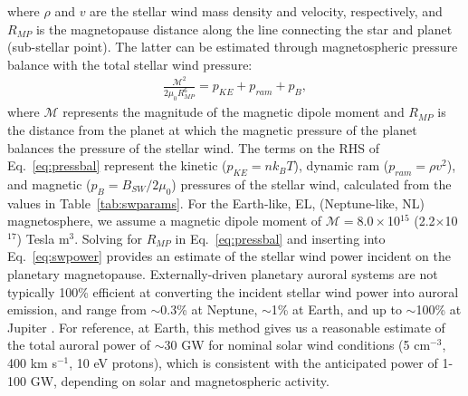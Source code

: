 \documentclass[apjl]{emulateapj}
\begin{document}
\noindent where $\rho$ and $v$ are the stellar wind mass density and velocity, respectively, and $R_{MP}$ is the magnetopause distance along the line connecting the star and planet (sub-stellar point). The latter can be estimated through magnetospheric pressure balance with the total stellar wind pressure:
\begin{align}
    \frac{\mathcal{M}^2}{2 \mu_0 R_{MP}^6} = p_{KE} + p_{ram} + p_{B}, \label{eq:pressbal}
\end{align}
where $\mathcal{M}$ represents the magnitude of the magnetic dipole moment and $R_{MP}$ is the distance from the planet at which the magnetic pressure of the planet balances the pressure of the stellar wind. The terms on the RHS of Eq.~\ref{eq:pressbal} represent the kinetic ($p_{KE}=n k_B T$), dynamic ram ($p_{ram}=\rho v^2$), and magnetic ($p_B=B_{SW}/2 \mu_0$) pressures of the stellar wind, calculated from the values in Table~\ref{tab:swparams}. 
For the Earth-like, EL, (Neptune-like, NL) magnetosphere, we assume a magnetic dipole moment of $\mathcal{M}=8.0\times$10$^{15}$ (2.2$\times$10$^{17}$) Tesla m$^3$. Solving for $R_{MP}$ in Eq.~\ref{eq:pressbal} and inserting into Eq.~\ref{eq:swpower} provides an estimate of the stellar wind power incident on the planetary magnetopause. Externally-driven planetary auroral systems are not typically 100\% efficient at converting the incident stellar wind power into auroral emission, and range from $\sim$0.3\% at Neptune, $\sim$1\% at Earth, and up to $\sim$100\% at Jupiter \citep[e.g.][]{Cheng1990,Bhardwaj2000}. For reference, at Earth, this method gives us a reasonable estimate of the total auroral power of $\sim$30 GW for nominal solar wind conditions (5 cm$^{-3}$, 400 km s$^{-1}$, 10 eV protons), which is consistent with the anticipated power of 1-100 GW, depending on solar and magnetospheric activity.
\end{document}
